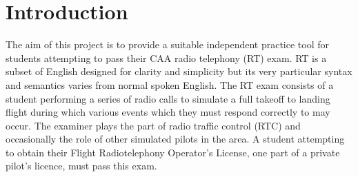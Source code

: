 \section{Introduction}

The aim of this project is to provide a suitable independent practice tool for students attempting to pass their CAA radio telephony (RT) exam. RT is a subset of English designed for clarity and simplicity but its very particular syntax and semantics varies from normal spoken English.
The RT exam consists of a student performing a series of radio calls to simulate a full takeoff to landing flight during which various events which they must respond correctly to may occur.
The examiner plays the part of radio traffic control (RTC) and occasionally the role of other simulated pilots in the area.
A student attempting to obtain their Flight Radiotelephony Operator's License, one part of a private pilot's licence, must pass this exam.